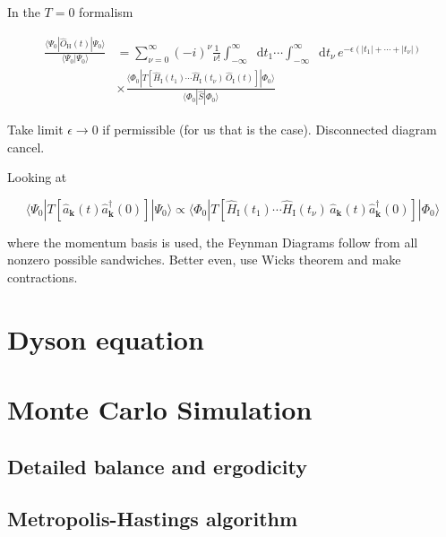 \documentclass[12pt]{report}
\renewcommand{\vec}[1]{\boldsymbol{\mathbf{#1}}}                        %
\newcommand*\diff{\mathop{}\!\mathrm{d}}
\begin{document}
In the $ T = 0 $ formalism

\begin{equation}
	\begin{split}
		\frac{\langle \Psi_0 |  \hat O_\text{H}(t)  | \Psi_0 \rangle}{\langle \Psi_0  | \Psi_0 \rangle}
		&=
		\sum_{\nu = 0}^\infty \left( - i \right)^\nu \frac{1}{\nu !}
		\int_{-\infty}^{\infty} \diff t_1 \cdots \int_{-\infty}^{\infty} \diff t_\nu
		\, e^{- \epsilon \left( |t_1| + \cdots + |t_\nu| \right)} \\[1em]
		&\times \frac{\langle \Phi_0  | T[\hat H_\text{I} (t_1) \cdots \hat H_\text{I} (t_\nu) \, \hat O_\text{I}(t)] | \Phi_0 \rangle}{\langle \Phi_0  | \hat S |\Phi_0 \rangle}
	\end{split}
\end{equation}

Take limit $ \epsilon \rightarrow 0 $ if permissible (for us that is the case). Disconnected diagram cancel.

Looking at

\begin{equation}
	\langle \Psi_0 |  T[\hat a_{\vec k}(t) \hat a^\dagger_{\vec k}(0)]  | \Psi_0 \rangle
	\propto
	\langle \Phi_0  | T[\hat H_\text{I} (t_1) \cdots \hat H_\text{I} (t_\nu) \, \hat a_{\vec k}(t) \hat a^\dagger_{\vec k}(0)] | \Phi_0 \rangle
\end{equation}

where the momentum basis is used, the Feynman Diagrams follow from all nonzero possible sandwiches. Better even, use Wicks theorem and make contractions.




\section{Dyson equation}



\section{Monte Carlo Simulation}

\subsection{Detailed balance and ergodicity}

\subsection{Metropolis-Hastings algorithm}
\end{document}
